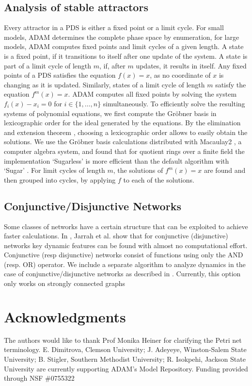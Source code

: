 \documentclass[11pt]{amsart}
\begin{document}
\subsection{Analysis of stable attractors}
Every attractor in a PDS is either a
fixed point or a limit cycle. For small models, ADAM determines the complete
phase space by enumeration, for large models, ADAM computes fixed points and
limit cycles of a given length.
A state is a fixed point, if it transitions to itself after one update of the
system. A state is part of a limit cycle of length $m$, if,
after $m$ updates, it results in itself. Any fixed points of a PDS satisfies
the equation $f(x) = x$, as no coordinate of $x$ is changing as it is updated.
Similarly, states of a
limit cycle of length $m$ satisfy the equation $f^m(x) = x$. ADAM computes all
fixed points by solving the system $f_i(x) - x_i = 0$ for $i \in \{1, \ldots,
n\}$ simultaneously. To efficiently solve the resulting systems of polynomial
equations, we first compute the Gr\"obner
basis in lexicographic order for the ideal generated by the equations.
By the elimination and extension theorem \cite{IVA}, choosing a lexicographic order
allows to easily obtain the solutions.
We use the Gr\"obner basis calculations distributed with Macaulay2 \cite{M2}, a
computer algebra system, and found that for quotient rings over a finite field
the implementation `Sugarless' is more efficient than the default algorithm
with `Sugar' \cite{Sugar:1991}.
For limit cycles of length $m$, the solutions of $f^m(x)=x$ are found and then
grouped into cycles, by applying $f$ to each of the solutions.
\subsection{Conjunctive/Disjunctive Networks} \label{sec:conj}
Some classes of networks have a certain structure that can be
exploited to achieve faster calculations. In \cite{conjunctive}, Jarrah et al.
show that for conjunctive (disjunctive) networks key dynamic features can be found with
almost no computational effort. Conjunctive (resp disjunctive) networks consist of
functions using only the AND (resp. OR) operator.
We include a separate algorithm to analyze
dynamics in the case of conjunctive/disjunctive networks as described in
\cite{conjunctive}. Currently,
this option only works on strongly connected graphs
\section*{Acknowledgments}
The authors would like to thank Prof Monika Heiner for clarifying the Petri
net terminology. E. Dimitrova, Clemson University; J. Adeyeye, Winston-Salem State University; B. Stigler, Southern Methodist University; R. Isokpehi, Jackson State University are currently supporting ADAM’s Model Repository. 
Funding provided through NSF \#0755322

%

\end{document}
